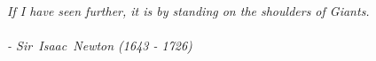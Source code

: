 

{
\thispagestyle{empty}
~\vfill

\begin{doublespace}
\noindent\fontsize{16}{22}\selectfont\itshape
\nohyphenation
If I have seen further, it is by standing on the shoulders of Giants.\\
\\
\noindent - \mbox{Sir Isaac Newton} (1643 - 1726)
\end{doublespace}

\vfill
\vfill
}
